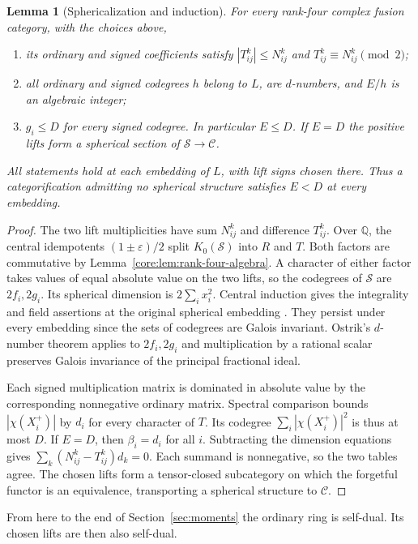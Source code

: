 \documentclass[11pt,a4paper]{article}
\newtheorem{lemma}[theorem]{Lemma}
\theoremstyle{definition}\newtheorem{definition}[theorem]{Definition}
\theoremstyle{remark}\newtheorem{remark}[theorem]{Remark}
\newcommand{\C}{\mathcal C}
\newcommand{\Q}{\mathbb Q}
\numberwithin{equation}{section}
\begin{document}
\begin{lemma}[Sphericalization and induction]\label{core:lem:family-induction}
For every rank-four complex fusion category, with the choices above,
\begin{enumerate}
\item its ordinary and signed coefficients satisfy
$|T_{ij}^k|\le N_{ij}^k$ and $T_{ij}^k\equiv N_{ij}^k\pmod2$;
\item all ordinary and signed codegrees $h$ belong to $L$, are
$d$-numbers, and $E/h$ is an algebraic integer;
\item $g_i\le D$ for every signed codegree. In particular $E\le D$.
If $E=D$ the positive lifts form a spherical section of $\mathcal S\to\C$.
\end{enumerate}
All statements hold at each embedding of $L$, with lift signs
chosen there. Thus a categorification admitting no spherical structure
satisfies $E<D$ at every embedding.
\end{lemma}
\begin{proof}
The two lift multiplicities have sum $N_{ij}^k$ and difference
$T_{ij}^k$. Over $\Q$, the central idempotents $(1\pm\varepsilon)/2$
split $K_0(\mathcal S)$ into $R$ and $T$. Both factors are
commutative by Lemma~\ref{core:lem:rank-four-algebra}. A character
of either factor takes values of equal absolute value on the two
lifts, so the codegrees of $\mathcal S$ are $2f_i,2g_i$.
Its spherical dimension is $2\sum_i x_i^2$. Central induction gives
the integrality and field assertions at the original spherical embedding
\cite[Theorem~2.13 and Corollary~2.15]{Ostrik3}. They persist under
every embedding since the sets of codegrees are Galois invariant.
Ostrik's $d$-number theorem applies to $2f_i,2g_i$ and multiplication
by a rational scalar preserves Galois invariance of the principal
fractional ideal.

Each signed multiplication matrix is dominated in absolute value by
the corresponding nonnegative ordinary matrix. Spectral comparison
bounds $|\chi(X_i^+)|$ by $d_i$ for every character of $T$.
Its codegree $\sum_i|\chi(X_i^+)|^2$ is thus at most $D$.
If $E=D$, then $\beta_i=d_i$ for all $i$. Subtracting the dimension
equations gives $\sum_k(N_{ij}^k-T_{ij}^k)d_k=0$. Each summand is
nonnegative, so the two tables agree. The chosen lifts form a
tensor-closed subcategory on which the forgetful functor is an
equivalence, transporting a spherical structure to $\C$.
\end{proof}

From here to the end of Section~\ref{sec:moments} the ordinary ring
is self-dual. Its chosen lifts are then also self-dual.
\end{document}

